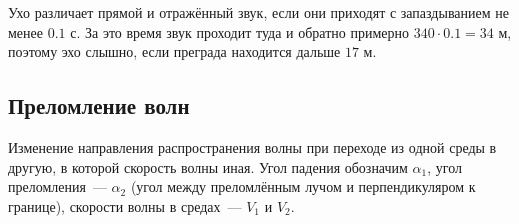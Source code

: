 \documentclass[12pt]{article}
\begin{document}
	\begin{example}[Эхо]
		Ухо различает прямой и отражённый звук, если они приходят с запаздыванием не менее $0.1$ с. За это время звук проходит туда и обратно примерно $340 \cdot 0.1 = 34$ м, поэтому эхо слышно, если преграда находится дальше $17$ м.
	\end{example}

	\subsection{Преломление волн}

	\begin{definition}[Преломление]
		Изменение направления распространения волны при переходе из одной среды в другую, в которой скорость волны иная. Угол падения обозначим $\alpha_1$, угол преломления~--- $\alpha_2$ (угол между преломлённым лучом и перпендикуляром к границе), скорости волны в средах~--- $V_1$ и $V_2$.
	\end{definition}
\end{document}
